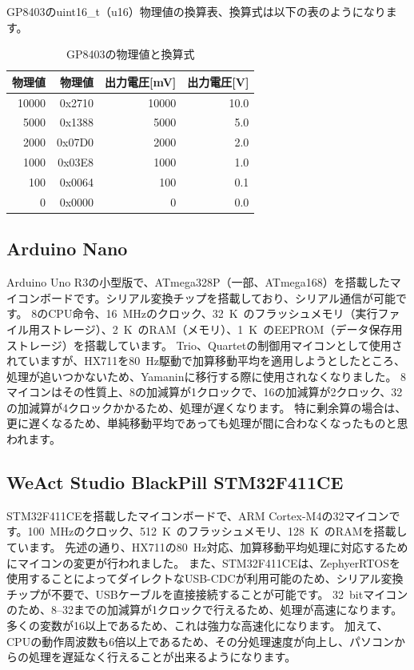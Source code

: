 GP8403のuint16\_t（u16）物理値の換算表、換算式は以下の表のようになります。

\begin{table}[htbp]
    \centering
    \caption{GP8403の物理値と換算式}
    \begin{tabular}{rrrr}
        \toprule
        物理値 & 物理値 & 出力電圧[\unit{\mV}] & 出力電圧[\unit{\V}] \\ \midrule
        10000 & 0x2710 &  10000 & 10.0 \\
        5000  & 0x1388 &   5000 &  5.0 \\
        2000  & 0x07D0 &   2000 &  2.0 \\
        1000  & 0x03E8 &   1000 &  1.0 \\
        100   & 0x0064 &    100 &  0.1 \\
        0     & 0x0000 &      0 &  0.0 \\ \bottomrule
    \end{tabular}
    \label{tab:gp8403_data}
\end{table}

\subsection{Arduino Nano}
Arduino Uno R3の小型版で、ATmega328P（一部、ATmega168）を搭載したマイコンボードです。シリアル変換チップを搭載しており、シリアル通信が可能です。
\qty{8}{\bit}のCPU命令、\qty{16}{\MHz}のクロック、\qty{32}{K\byte}のフラッシュメモリ（実行ファイル用ストレージ）、\qty{2}{K\byte}のRAM（メモリ）、\qty{1}{K\byte}のEEPROM（データ保存用ストレージ）を搭載しています。
Trio、Quartetの制御用マイコンとして使用されていますが、HX711を\qty{80}{\Hz}駆動で加算移動平均を適用しようとしたところ、処理が追いつかないため、Yamaninに移行する際に使用されなくなりました。
\qty{8}{\bit}マイコンはその性質上、\qty{8}{\bit}の加減算が1クロックで、\qty{16}{\bit}の加減算が2クロック、\qty{32}{\bit}の加減算が4クロックかかるため、処理が遅くなります。
特に剰余算の場合は、更に遅くなるため、単純移動平均であっても処理が間に合わなくなったものと思われます。

\subsection{WeAct Studio BlackPill STM32F411CE}
STM32F411CEを搭載したマイコンボードで、ARM Cortex-M4の\qty{32}{\bit}マイコンです。\qty{100}{MHz}のクロック、\qty{512}{K\byte}のフラッシュメモリ、\qty{128}{K\byte}のRAMを搭載しています。
先述の通り、HX711の\qty{80}{Hz}対応、加算移動平均処理に対応するためにマイコンの変更が行われました。
また、STM32F411CEは、ZephyerRTOSを使用することによってダイレクトなUSB-CDCが利用可能のため、シリアル変換チップが不要で、USBケーブルを直接接続することが可能です。
\qty{32}{bit}マイコンのため、\qtyrange{8}{32}{\bit}までの加減算が1クロックで行えるため、処理が高速になります。多くの変数が\qty{16}{\bit}以上であるため、これは強力な高速化になります。
加えて、CPUの動作周波数も6倍以上であるため、その分処理速度が向上し、パソコンからの処理を遅延なく行えることが出来るようになります。

